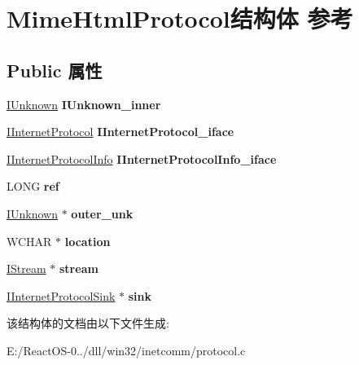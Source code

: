 \hypertarget{struct_mime_html_protocol}{}\section{Mime\+Html\+Protocol结构体 参考}
\label{struct_mime_html_protocol}
\subsection*{Public 属性}
\begin{DoxyCompactItemize}
\item 
\mbox{\label{struct_mime_html_protocol_a960b73d10b5d12c2f6c2a7eb2fa79375}} 
\hyperlink{interface_i_unknown}{I\+Unknown} {\bfseries I\+Unknown\+\_\+inner}
\item 
\mbox{\label{struct_mime_html_protocol_a0c9bc02ebd6433817890797e508b1214}} 
\hyperlink{interface_i_internet_protocol}{I\+Internet\+Protocol} {\bfseries I\+Internet\+Protocol\+\_\+iface}
\item 
\mbox{\label{struct_mime_html_protocol_a250336c0ad9d85fb33c7aade47b8fe61}} 
\hyperlink{interface_i_internet_protocol_info}{I\+Internet\+Protocol\+Info} {\bfseries I\+Internet\+Protocol\+Info\+\_\+iface}
\item 
\mbox{\label{struct_mime_html_protocol_a2998e9c5d76be9162e3873bb3a284600}} 
L\+O\+NG {\bfseries ref}
\item 
\mbox{\label{struct_mime_html_protocol_a7bd40c240d65ba4a7194c0ef4b0395b3}} 
\hyperlink{interface_i_unknown}{I\+Unknown} $\ast$ {\bfseries outer\+\_\+unk}
\item 
\mbox{\label{struct_mime_html_protocol_ad923ad6e842b6cee1e45642cb52e994c}} 
W\+C\+H\+AR $\ast$ {\bfseries location}
\item 
\mbox{\label{struct_mime_html_protocol_a9c10f2b164376de486447117a088461a}} 
\hyperlink{interface_i_stream}{I\+Stream} $\ast$ {\bfseries stream}
\item 
\mbox{\label{struct_mime_html_protocol_a143b64de73a8d6e9840b9383d0e1c4cb}} 
\hyperlink{interface_i_internet_protocol_sink}{I\+Internet\+Protocol\+Sink} $\ast$ {\bfseries sink}
\end{DoxyCompactItemize}


该结构体的文档由以下文件生成\+:\begin{DoxyCompactItemize}
\item 
E\+:/\+React\+O\+S-\/0../dll/win32/inetcomm/protocol.\+c\end{DoxyCompactItemize}
